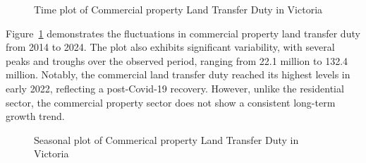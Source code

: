 \documentclass[
  11pt,
  a4paper,
]{article}
\begin{document}
\begin{figure}


\caption{\label{fig-commtrend}Time plot of Commercial property Land
Transfer Duty in Victoria}

\end{figure}%

Figure~\ref{fig-commtrend} demonstrates the fluctuations in commercial
property land transfer duty from 2014 to 2024. The plot also exhibits
significant variability, with several peaks and troughs over the
observed period, ranging from 22.1 million to 132.4 million. Notably,
the commercial land transfer duty reached its highest levels in early
2022, reflecting a post-Covid-19 recovery. However, unlike the
residential sector, the commercial property sector does not show a
consistent long-term growth trend.

\begin{figure}


\caption{\label{fig-commspattern}Seasonal plot of Commerical property
Land Transfer Duty in Victoria}

\end{figure}%
\end{document}
